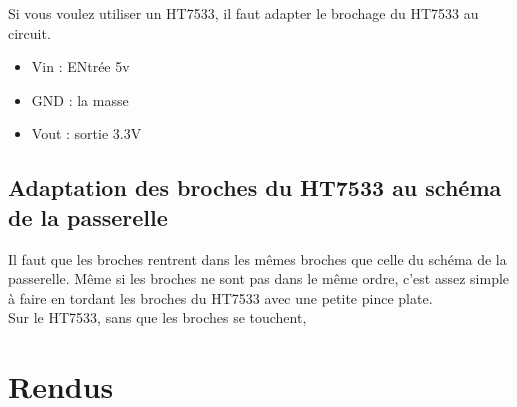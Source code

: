 Si vous voulez utiliser un HT7533, il faut adapter le brochage du HT7533 au circuit.

\begin{itemize}
    \item Vin : ENtrée 5v
    \item GND : la masse
    \item Vout : sortie 3.3V
\end{itemize}


\subsection{Adaptation des broches du HT7533 au schéma de la passerelle}

Il faut que les broches  rentrent dans les mêmes broches que celle du schéma de la passerelle. Même si les broches ne sont pas dans le même ordre, c'est assez simple à faire en tordant les broches du HT7533 avec une petite pince plate.\\

Sur le HT7533, sans que les broches se touchent, 


\section{Rendus}

